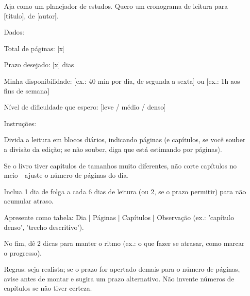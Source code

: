 \documentclass[11pt, a4paper]{article}
\begin{document}
\begin{promptbox}
Aja como um planejador de estudos. Quero um cronograma de leitura para [título], de [autor].

Dados:

Total de páginas: [x]

Prazo desejado: [x] dias

Minha disponibilidade: [ex.: 40 min por dia, de segunda a sexta] ou [ex.: 1h aos fins de semana]

Nível de dificuldade que espero: [leve / médio / denso]

Instruções:

Divida a leitura em blocos diários, indicando páginas (e capítulos, se você souber a divisão da edição; se não souber, diga que está estimando por páginas).

Se o livro tiver capítulos de tamanhos muito diferentes, não corte capítulos no meio - ajuste o número de páginas do dia.

Inclua 1 dia de folga a cada 6 dias de leitura (ou 2, se o prazo permitir) para não acumular atraso.

Apresente como tabela: Dia | Páginas | Capítulos | Observação (ex.: 'capítulo denso', 'trecho descritivo').

No fim, dê 2 dicas para manter o ritmo (ex.: o que fazer se atrasar, como marcar o progresso).

Regras: seja realista; se o prazo for apertado demais para o número de páginas, avise antes de montar e sugira um prazo alternativo. Não invente números de capítulos se não tiver certeza.
\end{promptbox}
\end{document}
